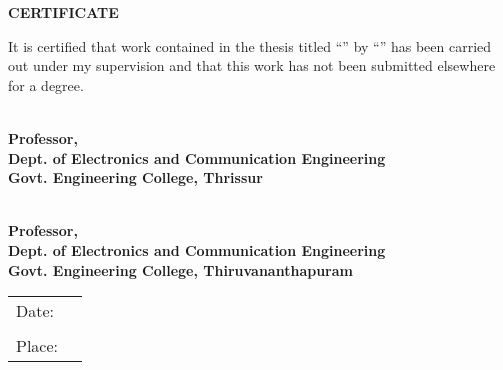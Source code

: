 
\begin{center}
{\bf\large CERTIFICATE }\\
\par\vspace{5mm}
\end{center}
\noindent It is certified that work contained in the thesis titled
``\textbf\thetitle{}'' by ``\thescholar'' has been
carried out under my supervision and that this work has not been submitted
elsewhere for a degree.
\vspace{20mm}

\begin{flushleft}
\textbf{\thesupervisor\\
Professor,\\Dept. of Electronics and Communication Engineering\\ Govt.
Engineering College, Thrissur}
\vspace{1cm}

\textbf{\thecosupervisor\\
Professor,\\Dept. of Electronics and Communication Engineering\\ Govt.
Engineering College, Thiruvananthapuram}

\end{flushleft}
\vspace{5mm}



\begin{flushleft}
\vspace{25mm}
\begin{tabular}{@{}p{1cm}p{5cm}@{}}
Date: & \hrulefill\\
& \\
Place: & \hrulefill\\
\end{tabular}
\end{flushleft}